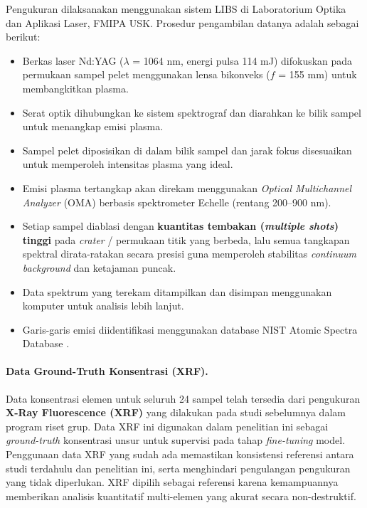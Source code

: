 \documentclass[12pt, a4paper]{article}
\begin{document}
Pengukuran dilaksanakan menggunakan sistem LIBS di Laboratorium Optika dan Aplikasi Laser, FMIPA USK. Prosedur pengambilan datanya adalah sebagai berikut:
\begin{itemize}[leftmargin=2cm]
    \item Berkas laser Nd:YAG ($\lambda$ = 1064 nm, energi pulsa 114 mJ) difokuskan pada permukaan sampel pelet menggunakan lensa bikonveks ($f$ = 155 mm) untuk membangkitkan plasma.
    \item Serat optik dihubungkan ke sistem spektrograf dan diarahkan ke bilik sampel untuk menangkap emisi plasma.
    \item Sampel pelet diposisikan di dalam bilik sampel dan jarak fokus disesuaikan untuk memperoleh intensitas plasma yang ideal.
    \item Emisi plasma tertangkap akan direkam menggunakan \textit{Optical Multichannel Analyzer} (OMA) berbasis spektrometer Echelle (rentang 200--900 nm).
    \item Setiap sampel diablasi dengan \textbf{kuantitas tembakan (\textit{multiple shots}) tinggi} pada \textit{crater} / permukaan titik yang berbeda, lalu semua tangkapan spektral dirata-ratakan secara presisi guna memperoleh stabilitas \textit{continuum} \textit{background} dan ketajaman puncak.
    \item Data spektrum yang terekam ditampilkan dan disimpan menggunakan komputer untuk analisis lebih lanjut.
    \item Garis-garis emisi diidentifikasi menggunakan database NIST Atomic Spectra Database \cite{kramida2024}.
\end{itemize}


\paragraph{Data Ground-Truth Konsentrasi (XRF).}
Data konsentrasi elemen untuk seluruh 24 sampel telah tersedia dari pengukuran \textbf{X-Ray Fluorescence (XRF)} yang dilakukan pada studi sebelumnya dalam program riset grup. Data XRF ini digunakan dalam penelitian ini sebagai \textit{ground-truth} konsentrasi unsur untuk supervisi pada tahap \textit{fine-tuning} model. Penggunaan data XRF yang sudah ada memastikan konsistensi referensi antara studi terdahulu dan penelitian ini, serta menghindari pengulangan pengukuran yang tidak diperlukan. XRF dipilih sebagai referensi karena kemampuannya memberikan analisis kuantitatif multi-elemen yang akurat secara non-destruktif.


\end{document}
